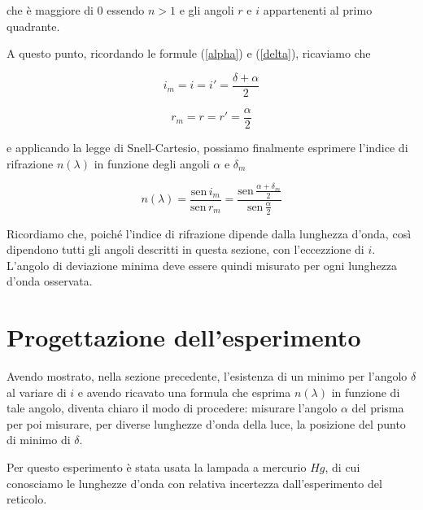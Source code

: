\documentclass{article}
\begin{document}
\vspace{3mm}

che è maggiore di 0 essendo $n>1$ e gli angoli $r$ e $i$ appartenenti al primo quadrante.

A questo punto, ricordando le formule (\ref{alpha}) e (\ref{delta}), ricaviamo che

\begin{equation}
i_m = i = i' =\frac{\delta + \alpha}{2}
\end{equation}

\begin{equation}
r_m = r = r'=\frac{\alpha}{2}
\end{equation}

\vspace{3mm}

e applicando la legge di Snell-Cartesio, possiamo finalmente esprimere l'indice di rifrazione $n (\lambda)$ in funzione degli angoli $\alpha$ e $\delta _m$

\begin{equation}
n(\lambda)=\frac{\textrm{sen}\, i_m}{\textrm{sen}\, r_m}=\frac{\textrm{sen}\, \frac{\alpha + \delta _m}{2}}{\textrm{sen}\, \frac{\alpha}{2}}
\end{equation}

\vspace{1mm}

Ricordiamo che, poiché l'indice di rifrazione dipende dalla lunghezza d'onda, così dipendono tutti gli angoli descritti in questa sezione, con l'eccezzione di $i$. L'angolo di deviazione minima deve essere quindi misurato per ogni lunghezza d'onda osservata.

\clearpage

\section{Progettazione dell'esperimento}

Avendo mostrato, nella sezione precedente, l'esistenza di un minimo per l'angolo $\delta$ al variare di $i$ e avendo ricavato una formula che esprima $n(\lambda)$ in funzione di tale angolo, diventa chiaro il modo di procedere: misurare l'angolo $\alpha$ del prisma per poi misurare, per diverse lunghezze d'onda della luce, la posizione del punto di minimo di $\delta$.

\vspace{5mm}

Per questo esperimento è stata usata la lampada a mercurio $Hg$, di cui conosciamo le lunghezze d'onda con relativa incertezza dall'esperimento del reticolo.
\end{document}
